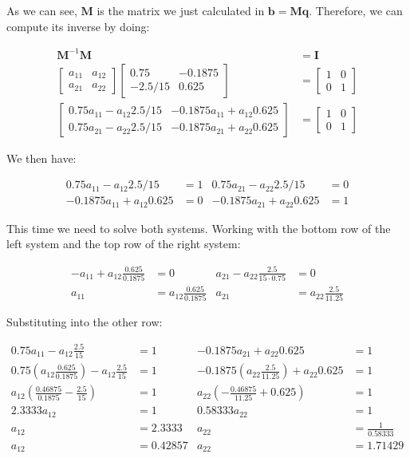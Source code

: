 As we can see, $\boldsymbol{M}$ is the matrix we just calculated in $\boldsymbol{b}=\boldsymbol{M}\boldsymbol{q}$. Therefore, we can compute its inverse by doing:


\begin{align}
\boldsymbol{M}^{-1}\boldsymbol{M} & =\boldsymbol{I}\\
\left[\begin{array}{cc}
a_{11} & a_{12}\\
a_{21} & a_{22}
\end{array}\right]\left[\begin{array}{cc}
0.75 & -0.1875\\
-2.5/15 & 0.625
\end{array}\right] & = \left[\begin{array}{cc}
1 & 0\\
0 & 1
\end{array}\right]\\
\left[\begin{array}{cc}
0.75a_{11}-a_{12}2.5/15 & -0.1875a_{11}+a_{12}0.625\\
0.75a_{21}-a_{22}2.5/15 & -0.1875a_{21}+a_{22}0.625
\end{array}\right] & = \left[\begin{array}{cc}
1 & 0\\
0 & 1
\end{array}\right]
\end{align}

We then have:

\begin{align}
0.75a_{11}-a_{12}2.5/15 & =1 & 0.75a_{21}-a_{22}2.5/15 & =0\\
-0.1875a_{11}+a_{12}0.625 & =0 & -0.1875a_{21}+a_{22}0.625 & =1
\end{align}

This time we need to solve both systems. Working with the bottom row of the left system and the top row of the right system:


\begin{align}
-a_{11}+a_{12}\frac{0.625}{0.1875} & =0 & a_{21}-a_{22}\frac{2.5}{15\cdot0.75} & =0\\
a_{11} & =a_{12}\frac{0.625}{0.1875} & a_{21} & =a_{22}\frac{2.5}{11.25}
\end{align}

Substituting into the other row:

\begin{align}
0.75a_{11}-a_{12}\frac{2.5}{15} & =1 & -0.1875a_{21}+a_{22}0.625 & =1\\
0.75\left(a_{12}\frac{0.625}{0.1875}\right)-a_{12}\frac{2.5}{15} & =1 & -0.1875\left(a_{22}\frac{2.5}{11.25}\right)+a_{22}0.625 & =1\\
a_{12}\left(\frac{0.46875}{0.1875}-\frac{2.5}{15}\right) & =1 & a_{22}\left(-\frac{0.46875}{11.25}+0.625\right) & =1\\
2.3333a_{12} & =1 & 0.58333a_{22} & =1\\
a_{12} & =2.3333 & a_{22} & =\frac{1}{0.58333}\\
a_{12} & =0.42857 & a_{22} & =1.71429
\end{align}

